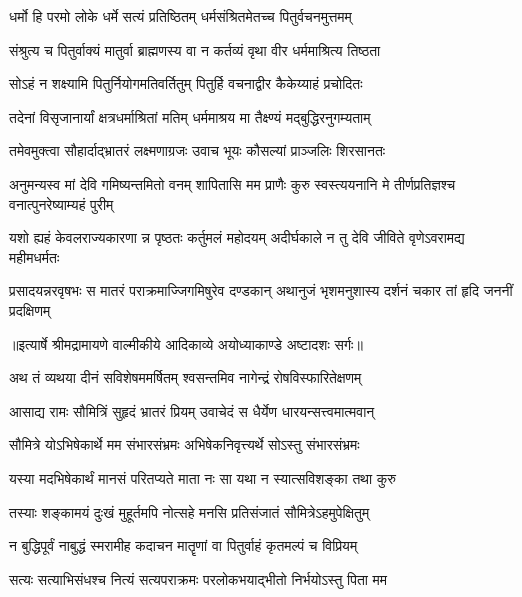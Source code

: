 \twolineshloka
{धर्मो हि परमो लोके धर्मे सत्यं प्रतिष्ठितम्}
{धर्मसंश्रितमेतच्च पितुर्वचनमुत्तमम्} %

\twolineshloka
{संश्रुत्य च पितुर्वाक्यं मातुर्वा ब्राह्मणस्य वा}
{न कर्तव्यं वृथा वीर धर्ममाश्रित्य तिष्ठता} %

\twolineshloka
{सोऽहं न शक्ष्यामि पितुर्नियोगमतिवर्तितुम्}
{पितुर्हि वचनाद्वीर कैकेय्याहं प्रचोदितः} %

\twolineshloka
{तदेनां विसृजानार्यां क्षत्रधर्माश्रितां मतिम्}
{धर्ममाश्रय मा तैक्ष्ण्यं मद्बुद्धिरनुगम्यताम्} %

\twolineshloka
{तमेवमुक्त्वा सौहार्दाद्भ्रातरं लक्ष्मणाग्रजः}
{उवाच भूयः कौसल्यां प्राञ्जलिः शिरसानतः} %

\threelineshloka
{अनुमन्यस्व मां देवि गमिष्यन्तमितो वनम्}
{शापितासि मम प्राणैः कुरु स्वस्त्ययनानि मे}
{तीर्णप्रतिज्ञश्च वनात्पुनरेष्याम्यहं पुरीम्} %

\fourlineindentedshloka
{यशो ह्यहं केवलराज्यकारणा}
{न्न पृष्ठतः कर्तुमलं महोदयम्}
{अदीर्घकाले न तु देवि जीविते}
{ वृणेऽवरामद्य महीमधर्मतः} %

\fourlineindentedshloka
{प्रसादयन्नरवृषभः स मातरं}
{ पराक्रमाज्जिगमिषुरेव दण्डकान्}
{अथानुजं भृशमनुशास्य दर्शनं}
{ चकार तां हृदि जननीं प्रदक्षिणम्} %


{॥इत्यार्षे श्रीमद्रामायणे वाल्मीकीये आदिकाव्ये अयोध्याकाण्डे अष्टादशः सर्गः॥}


\twolineshloka
{अथ तं व्यथया दीनं सविशेषममर्षितम्}
{श्वसन्तमिव नागेन्द्रं रोषविस्फारितेक्षणम्} %

\twolineshloka
{आसाद्य रामः सौमित्रिं सुहृदं भ्रातरं प्रियम्}
{उवाचेदं स धैर्येण धारयन्सत्त्वमात्मवान्} %

\twolineshloka
{सौमित्रे योऽभिषेकार्थे मम संभारसंभ्रमः}
{अभिषेकनिवृत्त्यर्थे सोऽस्तु संभारसंभ्रमः} %

\twolineshloka
{यस्या मदभिषेकार्थं मानसं परितप्यते}
{माता नः सा यथा न स्यात्सविशङ्का तथा कुरु} %

\twolineshloka
{तस्याः शङ्कामयं दुःखं मुहूर्तमपि नोत्सहे}
{मनसि प्रतिसंजातं सौमित्रेऽहमुपेक्षितुम्} %

\twolineshloka
{न बुद्धिपूर्वं नाबुद्धं स्मरामीह कदाचन}
{मातॄणां वा पितुर्वाहं कृतमल्पं च विप्रियम्} %

\twolineshloka
{सत्यः सत्याभिसंधश्च नित्यं सत्यपराक्रमः}
{परलोकभयाद्भीतो निर्भयोऽस्तु पिता मम} %

